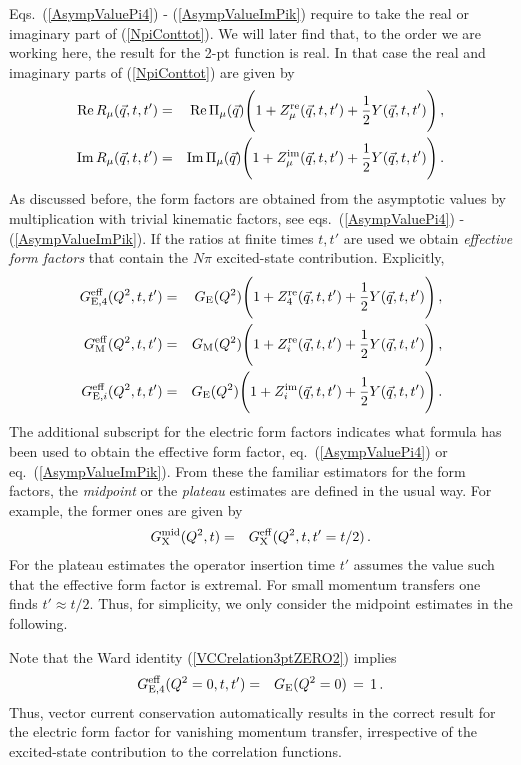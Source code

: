 \documentclass[11pt,prd,aps,showpacs,eqsecnum,floatfix,nofootinbib,preprint,tightenlines]{revtex4}
\newcommand{\pref}[1]{(\ref{#1})}
\newcommand{\GE}{G_{\rm E}}
\newcommand{\GM}{G_{\rm M}}
\newcommand{\GEf}{G_{{\rm E},{4}}}
\newcommand{\GEi}{G_{{\rm E},i}}
\begin{document}
Eqs.\ \pref{AsympValuePi4} - \pref{AsympValueImPik} require to take the real or imaginary part of \pref{NpiConttot}. We will later find that, to the order we are working here, the result for the 2-pt function is real. In that case the real and imaginary parts of \pref{NpiConttot} are given by
\begin{eqnarray}
{\rm Re}\, R_{\mu}(\vec{q},t,t')&=& {\rm Re}\, \Pi_{\mu}(\vec{q}) \Bigg(1+ Z^{\rm re}_{\mu}(\vec{q},t,t') + \frac{1}{2} Y(\vec{q},t,t')\Bigg)\,,\label{NpiConttotRE}\\
{\rm Im}\, R_{\mu}(\vec{q},t,t')&=& {\rm Im}\, \Pi_{\mu}(\vec{q}) \Bigg(1+ Z^{\rm im}_{\mu}(\vec{q},t,t') + \frac{1}{2} Y(\vec{q},t,t')\Bigg)\,.\label{NpiConttotIM}
\end{eqnarray}
As discussed before, the form factors are obtained from the asymptotic values by multiplication with trivial kinematic factors, see eqs.\ \pref{AsympValuePi4} - \pref{AsympValueImPik}. If the ratios at finite times $t,t'$ are used we obtain {\em effective form factors} that contain the $N\pi$ excited-state contribution. Explicitly,
\begin{eqnarray}
\GEf^{\rm eff}(Q^2,t,t') &=& \GE(Q^2) \Bigg(1+ Z^{\rm re}_{4}(\vec{q},t,t') + \frac{1}{2} Y(\vec{q},t,t')\Bigg)\,,\label{GEeffV4}\\
\GM^{\rm eff}(Q^2,t,t') &=& \GM(Q^2)\Bigg(1+ Z^{\rm re}_{i}(\vec{q},t,t') + \frac{1}{2} Y(\vec{q},t,t')\Bigg)\,,\label{GMeffVi}\\
\GEi^{\rm eff}(Q^2,t,t') &=& \GE(Q^2)\Bigg(1+ Z^{\rm im}_{i}(\vec{q},t,t') + \frac{1}{2} Y(\vec{q},t,t')\Bigg)\,.\label{GEeffVi}
\end{eqnarray}
The additional subscript for the electric form factors indicates what formula has been used to obtain the effective form factor, eq.\ \pref{AsympValuePi4} or eq.\ \pref{AsympValueImPik}. 
From these the familiar estimators for the form factors, the {\em midpoint} or the {\em plateau} estimates are defined in the usual way. For example, the former ones are given by
\begin{eqnarray}
G_{\rm X}^{\rm mid}(Q^2,t) & = & G_{\rm X}^{\rm eff}(Q^2,t,t'=t/2) \,.
\end{eqnarray}
For the plateau estimates the operator insertion time $t'$ assumes the value such that the effective form factor is extremal. For small momentum transfers one finds $t'\approx t/2$. Thus, for simplicity, we only consider the midpoint estimates in the following.

Note that the Ward identity \pref{VCCrelation3ptZERO2} implies 
\begin{eqnarray}
\GEf^{\rm eff}(Q^2=0,t,t') &=& \GE(Q^2=0) \,=\,1\,.
\end{eqnarray}
Thus, vector current conservation automatically results in the correct result for the electric form factor for vanishing momentum transfer, irrespective of the excited-state contribution to the correlation functions.
\end{document}

